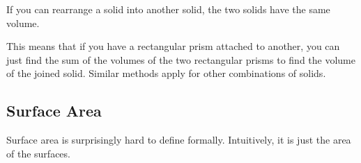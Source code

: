 \begin{center}
    \hspace{1.5cm}
\end{center}

\begin{fact}
If you can rearrange a solid into another solid, the two solids have the same volume.
\end{fact}

This means that if you have a rectangular prism attached to another, you can just find the sum of the volumes of the two rectangular prisms to find the volume of the joined solid. Similar methods apply for other combinations of solids.

\subsection{Surface Area}
Surface area is surprisingly hard to define formally. Intuitively, it is just the area of the surfaces.

